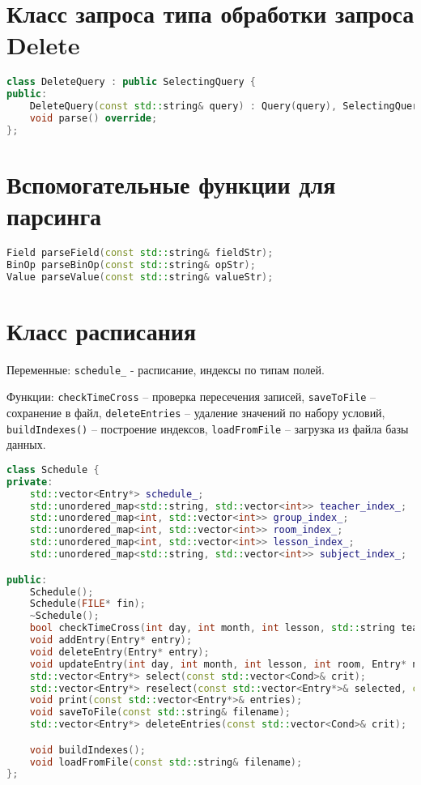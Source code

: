 \documentclass{article}
\begin{document}
\section*{Класс запроса типа обработки запроса Delete}

\begin{lstlisting}[language=C++]
class DeleteQuery : public SelectingQuery {
public:
    DeleteQuery(const std::string& query) : Query(query), SelectingQuery(query) {}
    void parse() override;
};
\end{lstlisting}

\section*{Вспомогательные функции для парсинга}

\begin{lstlisting}[language=C++]
Field parseField(const std::string& fieldStr);
BinOp parseBinOp(const std::string& opStr);
Value parseValue(const std::string& valueStr);
\end{lstlisting}

\section*{Класс расписания}

Переменные: \texttt{schedule\_} - расписание, индексы по типам полей.

Функции: \texttt{checkTimeCross} – проверка пересечения записей, \texttt{saveToFile} – сохранение в файл, \texttt{deleteEntries} – удаление значений по набору условий, \texttt{buildIndexes()} – построение индексов, \texttt{loadFromFile} – загрузка из файла базы данных.

\begin{lstlisting}[language=C++]
class Schedule {
private:
    std::vector<Entry*> schedule_;
    std::unordered_map<std::string, std::vector<int>> teacher_index_;
    std::unordered_map<int, std::vector<int>> group_index_;
    std::unordered_map<int, std::vector<int>> room_index_;
    std::unordered_map<int, std::vector<int>> lesson_index_;
    std::unordered_map<std::string, std::vector<int>> subject_index_;

public:
    Schedule();
    Schedule(FILE* fin);
    ~Schedule();
    bool checkTimeCross(int day, int month, int lesson, std::string teacher, int room, int group);
    void addEntry(Entry* entry);
    void deleteEntry(Entry* entry);
    void updateEntry(int day, int month, int lesson, int room, Entry* newEntry);
    std::vector<Entry*> select(const std::vector<Cond>& crit);
    std::vector<Entry*> reselect(const std::vector<Entry*>& selected, const std::vector<Cond>& crit);
    void print(const std::vector<Entry*>& entries);
    void saveToFile(const std::string& filename);
    std::vector<Entry*> deleteEntries(const std::vector<Cond>& crit);

    void buildIndexes();
    void loadFromFile(const std::string& filename);
};
\end{lstlisting}
\end{document}
